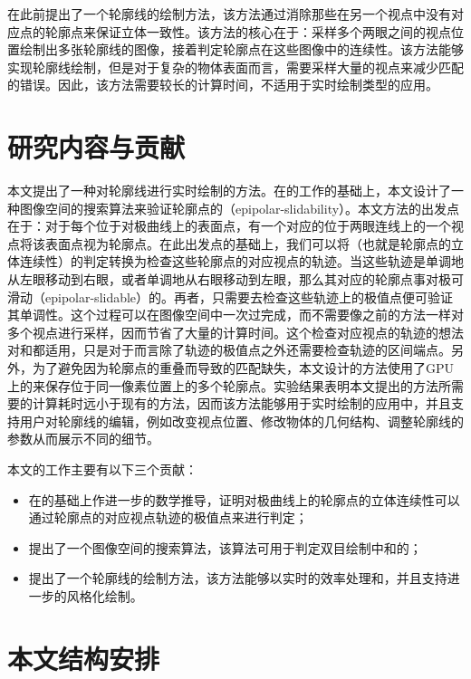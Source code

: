 \citeauthor{kim2013stereoscopic}在此前提出了一个\stc{}轮廓线的绘制方法\cite{kim2013stereoscopic}，该方法通过消除那些在另一个视点中没有对应点的轮廓点来保证立体一致性。该方法的核心在于：采样多个两眼之间的视点位置绘制出多张轮廓线的图像，接着判定轮廓点在这些图像中的连续性。该方法能够实现\stc{}轮廓线绘制，但是对于复杂的物体表面而言，需要采样大量的视点来减少匹配的错误。因此，该方法需要较长的计算时间，不适用于实时绘制类型的应用。

\section{研究内容与贡献}

本文提出了一种对\stc{}轮廓线进行实时绘制的方法。在\citeauthor{kim2013stereoscopic}的工作的基础上，本文设计了一种图像空间的搜索算法来验证轮廓点的\epsl{}（epipolar-slidability）。本文方法的出发点在于：对于每个位于对极曲线上的表面点，有一个对应的位于两眼连线上的一个视点将该表面点视为轮廓点。在此出发点的基础上，我们可以将\epsl{}（也就是轮廓点的立体连续性）的判定转换为检查这些轮廓点的对应视点的轨迹。当这些轨迹是单调地从左眼移动到右眼，或者单调地从右眼移动到左眼，那么其对应的轮廓点事对极可滑动（epipolar-slidable）的。再者，只需要去检查这些轨迹上的极值点便可验证其单调性。这个过程可以在图像空间中一次过完成，而不需要像之前的方法一样对多个视点进行采样，因而节省了大量的计算时间。这个检查对应视点的轨迹的想法对\con{}和\scon{}都适用，只是对于\scon{}而言除了轨迹的极值点之外还需要检查轨迹的区间端点。另外，为了避免因为轮廓点的重叠而导致的匹配缺失，本文设计的方法使用了GPU上的\ppll{}\cite{yang2010real}来保存位于同一像素位置上的多个轮廓点。实验结果表明本文提出的方法所需要的计算耗时远小于现有的方法，因而该方法能够用于实时绘制的应用中，并且支持用户对\stc{}轮廓线的编辑，例如改变视点位置、修改物体的几何结构、调整轮廓线的参数从而展示不同的细节。

本文的工作主要有以下三个贡献：

\begin{itemize}
    \item 在\epsl{}的基础上作进一步的数学推导，证明对极曲线上的轮廓点的立体连续性可以通过轮廓点的对应视点轨迹的极值点来进行判定；
    \item 提出了一个图像空间的搜索算法，该算法可用于判定双目绘制中\con{}和\scon{}的\epsl{}；
    \item 提出了一个\stc{}轮廓线的绘制方法，该方法能够以实时的效率处理\con{}和\scon{}，并且支持进一步的风格化绘制。
\end{itemize}

\section{本文结构安排}

